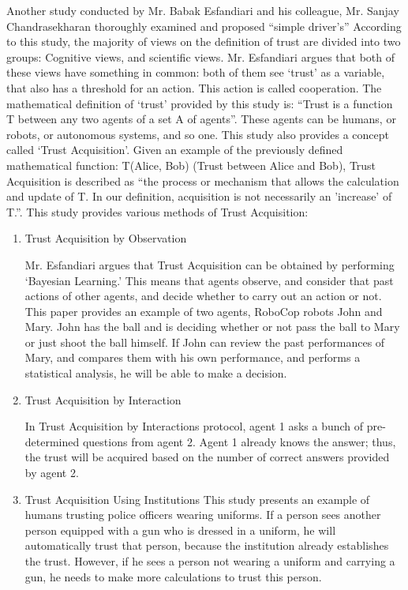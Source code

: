 \documentclass[runningheads,a4paper]{llncs}
\begin{document}
Another study conducted by Mr. Babak Esfandiari and his colleague, Mr. Sanjay Chandrasekharan \cite{esfandiari2001agents} thoroughly examined and proposed ``simple
driver's'' According to this study, the majority of views on the definition of trust are divided into two groups: Cognitive views, and scientific views. Mr. Esfandiari argues that both of these views have something in common: both of them see `trust' as a variable, that also has a threshold for an action. This action is called cooperation. The mathematical definition of `trust' provided by this study is: ``Trust is a function T between any two agents of a set A of agents''. These agents can be humans, or robots, or autonomous systems, and so one. This study also provides a concept called `Trust Acquisition'. Given an example of the previously defined mathematical function: T(Alice, Bob) (Trust between Alice and Bob), Trust Acquisition is described as ``the process or mechanism that allows the calculation and update of T. In our
definition, acquisition is not necessarily an 'increase' of T.''. This study provides various methods of Trust Acquisition:
\begin{enumerate}
    \item Trust Acquisition by Observation
    
    Mr. Esfandiari argues that Trust Acquisition can be obtained by performing `Bayesian Learning.' This means that agents observe, and consider that past actions of other agents, and decide whether to carry out an action or not. This paper provides an example of two agents, RoboCop robots John and Mary. John has the ball and is deciding whether or not pass the ball to Mary or just shoot the ball himself. If John can review the past performances of Mary, and compares them with his own performance, and performs a statistical analysis, he will be able to make a decision.
    \item Trust Acquisition by Interaction

    
    In Trust Acquisition by Interactions protocol, agent 1 asks a bunch of pre-determined questions from agent 2. Agent 1 already knows the answer; thus, the trust will be acquired based on the number of correct answers provided by agent 2.
    \item Trust Acquisition Using Institutions
    This study presents an example of humans trusting police officers wearing uniforms. If a person sees another person equipped with a gun who is dressed in a uniform, he will automatically trust that person, because the institution already establishes the trust. However, if he sees a person not wearing a uniform and carrying a gun, he needs to make more calculations to trust this person.
    
\end{enumerate}
\end{document}
